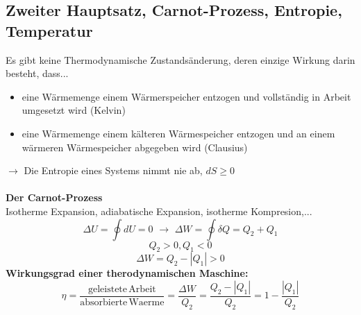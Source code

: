 \documentclass[a4paper,11pt]{scrartcl}
\begin{document}
\subsection{Zweiter Hauptsatz, Carnot-Prozess, Entropie, Temperatur}
Es gibt keine Thermodynamische Zustandsänderung, deren einzige Wirkung darin besteht, dass...
\begin{itemize}
 \item eine Wärmemenge einem Wärmerspeicher entzogen und vollständig in Arbeit umgesetzt wird (Kelvin)
 \item eine Wärmemenge einem kälteren Wärmespeicher entzogen und an einem wärmeren Wärmespeicher abgegeben wird (Clausius)
\end{itemize}
$\rightarrow$ Die Entropie eines Systems nimmt nie ab, $dS \geq 0$\\
\\
\textbf{Der Carnot-Prozess}\\
Isotherme Expansion, adiabatische Expansion, isotherme Kompresion,...\\
\begin{equation}
 \Delta U = \oint dU = 0 \, \, \rightarrow \,\, \Delta W = \oint \delta Q = Q_2 + Q_1
\end{equation}
$$Q_2 > 0, Q_1 < 0$$
$$\Delta W = Q_2 - |Q_1| > 0$$
\textbf{Wirkungsgrad einer therodynamischen Maschine:}
\begin{equation}
\eta = \frac{\mathrm{geleistete\, Arbeit}}{\mathrm{absorbierte\, Waerme}}= \frac{\Delta W}{Q_2}= \frac{Q_2 -|Q_1|}{Q_2}= 1 - \frac{|Q_1|}{Q_2}
\end{equation}
\end{document}
